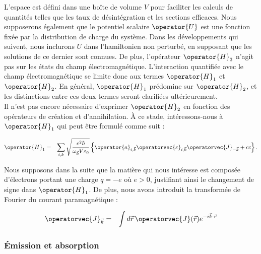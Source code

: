  


L'espace est défini dans une boîte de volume \( V \) pour faciliter les calculs de quantités telles que les taux de désintégration et les sections efficaces. Nous supposerons également que le potentiel scalaire \( \operator{U} \) est une fonction fixée par la distribution de charge du système. Dans les développements qui suivent, nous inclurons \( U \) dans l'hamiltonien non perturbé, en supposant que les solutions de ce dernier sont connues. De plus, l'opérateur \( \operator{H}_3 \) n'agit pas sur les états du champ électromagnétique. L'interaction quantifiée avec le champ électromagnétique se limite donc aux termes \( \operator{H}_1 \) et \( \operator{H}_2 \). En général, \( \operator{H}_1 \) prédomine sur \( \operator{H}_2 \), et les distinctions entre ces deux termes seront clarifiées ultérieurement.\\

Il n'est pas encore nécessaire d'exprimer \(\operator{H}_2 \) en fonction des opérateurs de création et d'annihilation. À ce stade, intéressons-nous à \( \operator{H}_1 \) qui peut être formulé comme suit :

\begin{eqnarray}
	\operator{H}_1  & =  &  \sum_{i,k}  \sqrt{\frac{ e^2 \hbar}{\omega_{\vec{k}} V \varepsilon_0}} \left\{ \operator{a}_{i , \vec{k}} \operatorvec{{\varepsilon}}_{i , \vec{k}} \operatorvec{J}_{-\vec{k}}  + cc \right \}	.	
\end{eqnarray}




Nous supposons dans la suite que la matière qui nous intéresse est composée d'électrons portant une charge \( q = -e \) où \( e > 0 \), justifiant ainsi le changement de signe dans \( \operator{H}_1\). De plus, nous avons introduit la transformée de Fourier du courant paramagnétique :

\begin{eqnarray}
	\operatorvec{J}_{\vec{k}}  & = &  \int d\vec{r}\, \operatorvec{J}(\vec{r}) e^{-i\vec{k} \cdot \vec{r}}
\end{eqnarray}

\subsubsection{Émission et absorption}
